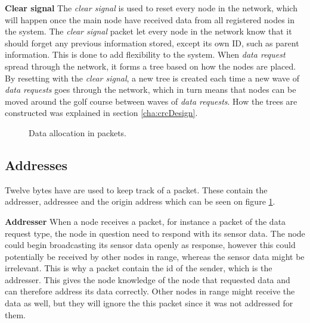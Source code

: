 \textbf{Clear signal}\newline
The \textit{clear signal} is used to reset every node in the network, which will happen once the main node have received data from all registered nodes in the system.
The \textit{clear signal} packet let every node in the network know that it should forget any previous information stored, except its own ID, such as parent information. This is done to add flexibility to the system. When \textit{data request} spread through the network, it forms a tree based on how the nodes are placed. By resetting with the \textit{clear signal}, a new tree is created each time a new wave of \textit{data requests} goes through the network, which in turn means that nodes can be moved around the golf course between waves of \textit{data requests}. How the trees are constructed was explained in section \ref{cha:crcDesign}.


\begin{figure}[h!]
	\centering
	\caption{Data allocation in packets.}
	\label{fig:dataalloc}
\end{figure}

\subsection{Addresses}
Twelve bytes have are used to keep track of a packet. These contain the addresser, addressee and the origin address which can be seen on figure \ref{fig:dataalloc}. 

\textbf{Addresser}\newline
When a node receives a packet, for instance a packet of the data request type, the node in question need to respond with its sensor data. The node could begin broadcasting its sensor data openly as response, however this could potentially be received by other nodes in range, whereas the sensor data might be irrelevant. This is why a packet contain the id of the sender, which is the addresser. This gives the node knowledge of the node that requested data and can therefore address its data correctly. Other nodes in range might receive the data as well, but they will ignore the this packet since it was not addressed for them.

